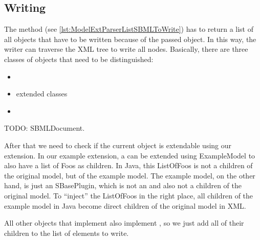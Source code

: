 \subsection{Writing}

The method  (see
\vref{lst:ModelExtParserListSBMLToWrite}) has to return a list of all
objects that have to be written because of the passed object.  In this way,
the writer can traverse the XML tree to write all nodes.  Basically, there
are three classes of objects that need to be distinguished:

\begin{itemize}
 \item {}
 \item extended classes
 \item {}
\end{itemize}

TODO: SBMLDocument.

After that we need to check if the current object is extendable using our extension.
In our example extension, a \Model{} can be extended using ExampleModel to also
have a list of Foos as children.
In Java, this ListOfFoos is not a children of the original model, but of the
example model.
The example model, on the other hand, is just an SBasePlugin, which is not an
\SBase{} and also not a children of the original model.
To ``inject'' the ListOfFoos in the right place, all children of the example
model in Java become direct children of the original model in XML.

All other objects that implement \SBase{} also implement \TreeNode, so we just add
all of their children to the list of elements to write.

